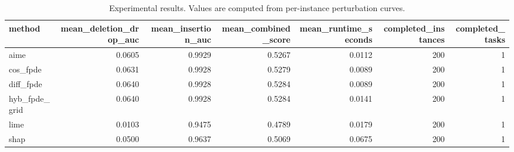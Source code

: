 \begin{table}[t]
\caption{Experimental results. Values are computed from per-instance perturbation curves.}
\label{tab:main_results_computed}
\centering
\begin{tabular}{lrrrrrr}
\toprule
method & mean\_deletion\_drop\_auc & mean\_insertion\_auc & mean\_combined\_score & mean\_runtime\_seconds & completed\_instances & completed\_tasks \\
\midrule
aime & 0.0605 & 0.9929 & 0.5267 & 0.0112 & 200 & 1 \\
cos\_fpde & 0.0631 & 0.9928 & 0.5279 & 0.0089 & 200 & 1 \\
diff\_fpde & 0.0640 & 0.9928 & 0.5284 & 0.0089 & 200 & 1 \\
hyb\_fpde\_grid & 0.0640 & 0.9928 & 0.5284 & 0.0141 & 200 & 1 \\
lime & 0.0103 & 0.9475 & 0.4789 & 0.0179 & 200 & 1 \\
shap & 0.0500 & 0.9637 & 0.5069 & 0.0675 & 200 & 1 \\
\bottomrule
\end{tabular}

\end{table}

